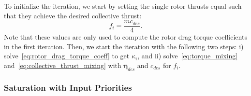 \documentclass[10pt,a4paper,fleqn]{article}
\newcommand{\bodytorque}[0]{\eta}
\newcommand{\bodytorques}[0]{\boldsymbol{\bodytorque}}
\newcommand{\thrust}[0]{c} %
\newcommand{\rotthrust}[1]{f_{#1}}
\newcommand{\torquecoeff}[1]{\kappa_{#1}}
\newcommand{\mass}[0]{m}
\begin{document}
To initialize the iteration, we start by setting the single rotor thrusts equal such that they achieve the desired collective thrust:
%
\begin{equation}
	\rotthrust{i} = \frac{\mass \thrust_{des}}{4}.
\end{equation}
%
Note that these values are only used to compute the rotor drag torque coefficients in the first iteration.
Then, we start the iteration with the following two steps: i) solve~\eqref{eq:rotor_drag_torque_coeff} to get $\torquecoeff{i}$, and ii) solve~\eqref{eq:torque_mixing} and~\eqref{eq:collective_thrust_mixing} with $\bodytorques_{des}$ and $\thrust_{des}$ for $\rotthrust{i}$.

\subsubsection{Saturation with Input Priorities}
\end{document}
